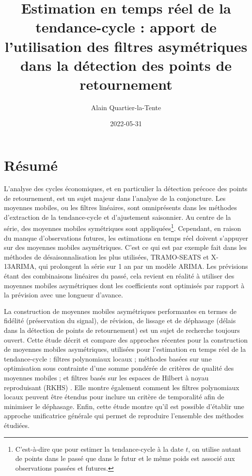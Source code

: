 \documentclass[
  12pt,
  a4paper,french]{article}
\title{Estimation en temps réel de la tendance-cycle : apport de l'utilisation des filtres asymétriques dans la détection des points de retournement}
\author{Alain Quartier-la-Tente}
\date{2022-05-31}
\newcommand\1{\mathds{1}}
\begin{document}
\maketitle

\thispagestyle{fancy}

\hypertarget{ruxe9sumuxe9}{%
\section*{Résumé}\label{ruxe9sumuxe9}}

L'analyse des cycles économiques, et en particulier la détection précoce
des points de retournement, est un sujet majeur dans l'analyse de la
conjoncture. Les moyennes mobiles, ou les filtres linéaires, sont
omniprésents dans les méthodes d'extraction de la tendance-cycle et
d'ajustement saisonnier. Au centre de la série, des moyennes mobiles
symétriques sont appliquées\footnote{ C'est-à-dire que pour estimer la
  tendance-cycle à la date \(t\), on utilise autant de points dans le
  passé que dans le futur et le même poids est associé aux observations
  passées et futures.}. Cependant, en raison du manque d'observations
futures, les estimations en temps réel doivent s'appuyer sur des
moyennes mobiles asymétriques. C'est ce qui est par exemple fait dans
les méthodes de désaisonnalisation les plus utilisées, TRAMO-SEATS et
X-13ARIMA, qui prolongent la série sur 1 an par un modèle ARIMA. Les
prévisions étant des combinaisons linéaires du passé, cela revient en
réalité à utiliser des moyennes mobiles asymétriques dont les
coefficients sont optimisés par rapport à la prévision avec une longueur
d'avance.

La construction de moyennes mobiles asymétriques performantes en termes
de fidélité (préservation du signal), de révision, de lissage et de
déphasage (délais dans la détection de points de retournement) est un
sujet de recherche toujours ouvert. Cette étude décrit et compare des
approches récentes pour la construction de moyennes mobiles
asymétriques, utilisées pour l'estimation en temps réel de la
tendance-cycle : filtres polynomiaux locaux
\autocite{proietti2008,GrayThomson1996} ; méthodes basées sur une
optimisation sous contrainte d'une somme pondérée de critères de qualité
des moyennes mobiles \autocite{ch15HBSA,trilemmaWMR2019} ; et filtres
basés sur les espaces de Hilbert à noyau reproduisant (RKHS)
\textcite{dagumbianconcini2008}. Elle montre également comment les
filtres polynomiaux locaux peuvent être étendus pour inclure un critère
de temporalité afin de minimiser le déphasage. Enfin, cette étude montre
qu'il est possible d'établir une approche unificatrice générale qui
permet de reproduire l'ensemble des méthodes étudiées.
\end{document}
